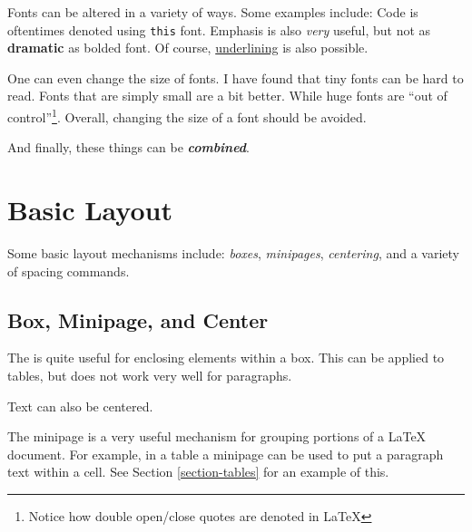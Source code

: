 \documentclass{article}
\begin{document}
Fonts can be altered in a variety of ways. Some examples include:
Code is oftentimes denoted using \texttt{this} font. Emphasis is
also \emph{very} useful, but not as \textbf{dramatic} as bolded
font. Of course, \underline{underlining} is also possible.

One can even change the {\Large size} of fonts. I have found that
{\tiny tiny} fonts can be hard to read. Fonts that are simply
{\small small} are a bit better. While {\Huge huge} fonts are
``out of control''\footnote{Notice how double open/close quotes
are denoted in LaTeX}. Overall, changing the size of a font should
be avoided.

And finally, these things can be \textbf{\emph{combined}}.

\section{Basic Layout}

Some basic layout mechanisms include: \emph{boxes},
\emph{minipages}, \emph{centering}, and a variety of spacing
commands.

\subsection{Box, Minipage, and Center}

The  is quite useful for enclosing elements within a
box. This can be applied to tables, but does not work very well
for paragraphs.

\begin{center}
Text can also be centered.
\end{center}

The minipage is a very useful mechanism for grouping portions of a
LaTeX document. For example, in a table a minipage can be used to
put a paragraph text within a cell. See Section
\ref{section-tables} for an example of this.

\bigskip

\begin{center}
\end{center}
\end{document}
